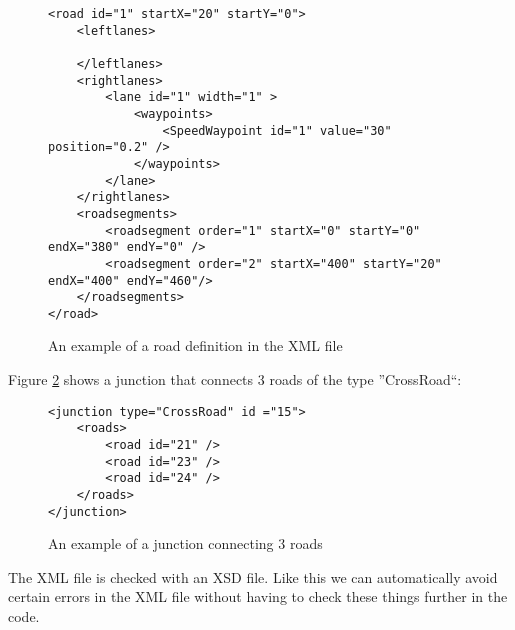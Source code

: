 \resetListing
\lstset{language=XML}
\begin{figure}[H]
\begin{lstlisting}
<road id="1" startX="20" startY="0">
	<leftlanes>

	</leftlanes>
	<rightlanes>
		<lane id="1" width="1" >
			<waypoints>
				<SpeedWaypoint id="1" value="30" position="0.2" />
			</waypoints>
		</lane>
	</rightlanes>
	<roadsegments>
		<roadsegment order="1" startX="0" startY="0" endX="380" endY="0" />
		<roadsegment order="2" startX="400" startY="20" endX="400" endY="460"/>
	</roadsegments>
</road>
\end{lstlisting}
\caption{An example of a road definition in the XML file}
\label{fig:xmlRoad}
\end{figure}

Figure \ref{fig:xmlJunction} shows a junction that connects 3 roads of the type 
''CrossRoad``:

\begin{figure}[H]
\begin{lstlisting}
<junction type="CrossRoad" id ="15">
	<roads>
		<road id="21" />
		<road id="23" />
		<road id="24" />
	</roads>
</junction>
\end{lstlisting}
\caption{An example of a junction connecting 3 roads}
\label{fig:xmlJunction}
\end{figure}

The XML file is checked with an XSD file. Like this we can automatically
avoid certain errors in the XML file without having to check these
things further in the code.


